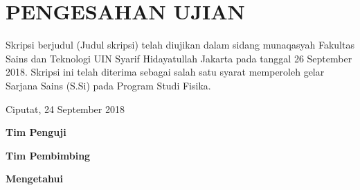 \chapter*{PENGESAHAN UJIAN}
Skripsi berjudul (Judul skripsi) telah diujikan dalam sidang munaqasyah Fakultas Sains dan Teknologi UIN Syarif Hidayatullah Jakarta pada tanggal 26 September 2018. Skripsi ini telah diterima sebagai salah satu syarat memperoleh gelar Sarjana Sains (S.Si) pada Program Studi Fisika.

\begin{flushright}
    Ciputat, 24 September 2018
\end{flushright}

\centerline{\textbf{Tim Penguji}}


\centerline{\textbf{Tim Pembimbing}}


\centerline{\textbf{Mengetahui}}

